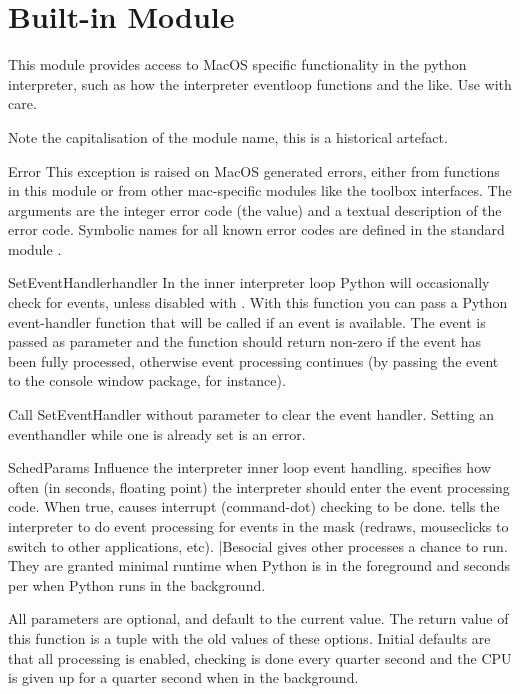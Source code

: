 \section{Built-in Module }
\label{module-MacOS}

\renewcommand{\indexsubitem}{(in module MacOS)}

This module provides access to MacOS specific functionality in the
python interpreter, such as how the interpreter eventloop functions
and the like. Use with care.

Note the capitalisation of the module name, this is a historical
artefact.

\begin{excdesc}{Error}
This exception is raised on MacOS generated errors, either from
functions in this module or from other mac-specific modules like the
toolbox interfaces. The arguments are the integer error code (the
 value) and a textual description of the error code.
Symbolic names for all known error codes are defined in the standard
module .
\end{excdesc}

\begin{funcdesc}{SetEventHandler}{handler}
In the inner interpreter loop Python will occasionally check for events,
unless disabled with . With this function you
can pass a Python event-handler function that will be called if an event
is available. The event is passed as parameter and the function should return
non-zero if the event has been fully processed, otherwise event processing
continues (by passing the event to the console window package, for instance).

Call SetEventHandler without parameter to clear the event handler. Setting
an eventhandler while one is already set is an error.
\end{funcdesc}

\begin{funcdesc}{SchedParams}{}
Influence the interpreter inner loop event handling. 
specifies how often (in seconds, floating point) the interpreter
should enter the event processing code. When true,  causes
interrupt (command-dot) checking to be done.  tells the
interpreter to do event processing for events in the mask (redraws,
mouseclicks to switch to other applications, etc). \bar{Besocial}
gives other processes a chance to run. They are granted minimal
runtime when Python is in the foreground and  seconds per
 when Python runs in the background.

All parameters are optional, and default to the current value. The return
value of this function is a tuple with the old values of these options.
Initial defaults are that all processing is enabled, checking is done every
quarter second and the CPU is given up for a quarter second when in the
background.
\end{funcdesc}


